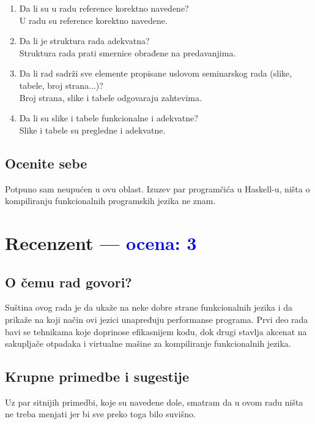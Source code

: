 \documentclass[a4paper]{report}
\newcommand{\odgovor}[1]{\textcolor{blue}{#1}}
\begin{document}
\begin{enumerate}
\item Da li su u radu reference korektno navedene?\\
U radu su reference korektno navedene.
\item Da li je struktura rada adekvatna?\\
Struktura rada prati smernice obrađene na predavanjima.
\item Da li rad sadrži sve elemente propisane uslovom seminarskog rada (slike, tabele, broj strana...)?\\
Broj strana, slike i tabele odgovaraju zahtevima.
\item Da li su slike i tabele funkcionalne i adekvatne?\\
Slike i tabele su pregledne i adekvatne.
\end{enumerate}

\section{Ocenite sebe}
Potpuno sam neupućen u ovu oblast. Izuzev par programčića u Haskell-u, ništa o kompiliranju funkcionalnih programskih jezika ne znam.

\chapter{Recenzent \odgovor{--- ocena: 3} }


\section{O čemu rad govori?}
Suština ovog rada je da ukaže na neke dobre strane funkcionalnih jezika i da prikaže na koji način ovi jezici unapređuju performanse programa.
Prvi deo rada bavi se tehnikama koje doprinose efikasnijem kodu, dok drugi stavlja akcenat na sakupljače otpadaka i virtualne mašine za kompiliranje funkcionalnih jezika. 

\section{Krupne primedbe i sugestije}
Uz par sitnijih primedbi, koje su navedene dole, smatram da u ovom radu ništa ne treba menjati jer bi sve preko toga bilo suvišno.
\end{document}
